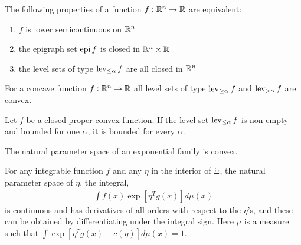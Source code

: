 \begin{theorem} \label{Thm:lsc epi}
 The following properties of a function $f: {\mathbb R}^n \to \bar{{\mathbb R}}$ are equivalent:
 \begin{enumerate}
	\item $f$ is lower semicontinuous on ${\mathbb R}^n$
	\item the epigraph set $\operatorname{epi} f$ is closed in ${\mathbb R}^n \times {\mathbb R}$
	\item the level sets of type $\operatorname{lev}_{\leq \alpha} f$ are all closed in ${\mathbb R}^n$
 \end{enumerate}
\end{theorem}


\begin{prop} \label{Prop:convex lev}
For a concave function $f: {\mathbb R}^n \to \bar{{\mathbb R}}$ all level sets of type $\operatorname{lev}_{\geq \alpha} f$ and $\operatorname{lev}_{> \alpha} f$ are convex.
\end{prop}

\begin{corollary} \label{Cor:bounded lev}
Let $f$ be a closed proper convex function.  If the level set $\operatorname{lev}_{\leq \alpha} f$ is non-empty and bounded for one $\alpha$, it is bounded for every $\alpha$.
\end{corollary}

\begin{lemma}
The natural parameter space of an exponential family is convex.
\end{lemma}

\begin{theorem} \label{Thm:infinitely-differentiable}
For any integrable function $f$ and any $\eta$ in the interior of $\Xi$, the natural parameter space of $\eta$, the integral,
\begin{align}
	\int f(x) \exp [ \eta^Tg(x) ] d\mu(x)
\end{align}
is continuous and has derivatives of all orders with respect to the $\eta$'s, and these can be obtained by differentiating under the integral sign.	Here $\mu$ is a measure such that $\int \exp [ \eta^Tg(x) - c(\eta)] d\mu(x) = 1$.
\end{theorem}

